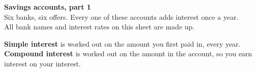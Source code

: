 \documentclass[12pt]{article}
\begin{document}
\begin{center}
  {\LARGE\bfseries Savings accounts, part 1}\\[1.5mm]
  {\small Six banks, six offers. Every one of these accounts adds interest once a year.\\
  All bank names and interest rates on this sheet are made up.}
\end{center}
\vspace{1mm}

\begin{tcolorbox}[enhanced,colback=black!4,colframe=black!45,boxrule=0.8pt,arc=2mm,
                  left=4mm,right=4mm,top=2.5mm,bottom=2.5mm]
{\bfseries Simple interest} is worked out on the amount you first paid in, every year.\\
{\bfseries Compound interest} is worked out on the amount in the account, so you earn interest on your interest.
\end{tcolorbox}
\vspace{2mm}
\end{document}
